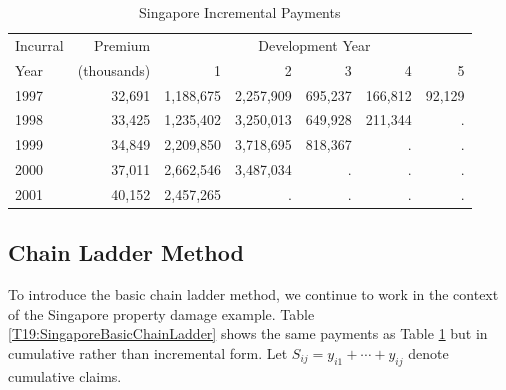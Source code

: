 \begin{center}  \begin{table}[h]
\caption{\label{T19:SingaporePropertyRunOff} Singapore Incremental
Payments }
\begin{tabular}{lr|rrrrr}
  \hline
  Incurral &   Premium &\multicolumn{5}{c}{Development Year }     \\
       Year       &  (thousands) &          1 &          2 &          3 &          4 &          5 \\
         \hline
1997 &     32,691 &  1,188,675 &  2,257,909 &    695,237 &    166,812 &     92,129 \\
1998 &     33,425 &  1,235,402 &  3,250,013 &    649,928 &    211,344 &          . \\
1999 &     34,849 &  2,209,850 &  3,718,695 &    818,367 &          . &          . \\
2000 &     37,011 &  2,662,546 &  3,487,034 &          . &          . &          . \\
2001 &     40,152 &  2,457,265 &          . &          . &          . &          . \\
        \hline
\end{tabular}
\end{table}  \end{center}
\linejed



\subsection{Chain Ladder Method}\label{S19:ChainLadder}

To introduce the basic chain ladder method, we continue to work in
the context of the Singapore property damage example. Table
\ref{T19:SingaporeBasicChainLadder} shows the same payments as Table
\ref{T19:SingaporePropertyRunOff} but in cumulative rather than
incremental form. Let $S_{ij} = y_{i1} + \cdots + y_{ij}$ denote
cumulative claims.

